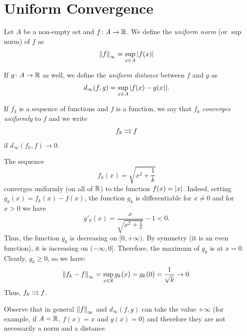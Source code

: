 \section{Uniform Convergence}

\begin{definition}
\mymark{***}
Let $A$ be a non-empty set and
$f\colon A \to {\mathbb R}$.
We define the \emph{uniform norm}%
 (or $\sup$ norm)
of $f$ as
\[
  {\left\Vert f\right\Vert}_\infty = \sup_{x\in A} {\left|f(x)\right|}
\]

If $g\colon A \to {\mathbb R}$ as well,
we define the \emph{uniform distance}
between $f$ and $g$ as
\[
  d_\infty(f,g) = \sup_{x\in A} {\left|f(x)-g(x)\right|}.
\]

If $f_k$ is a sequence of functions and $f$ is a function, we say that $f_k$
\emph{converges uniformly}
%
%
to $f$
and we write
\[
f_k \rightrightarrows f
\] if
$d_\infty(f_k,f)\to 0$.
\end{definition}


\begin{example}
\label{ex:466533}
The sequence
\[
f_k(x) = \sqrt{x^2 + \frac{1}{k}}
\]
converges uniformly (on all of ${\mathbb R}$) to the function $f(x) = {\left|x\right|}$. Indeed,
setting $g_k(x) = f_k(x) - f(x)$,
the function $g_k$ is differentiable for $x\neq 0$ and for $x>0$ we have
\[
  g'_k(x) = \frac{x}{\sqrt{x^2+\frac 1 k}} - 1 < 0.
\]
Thus, the function $g_k$ is decreasing on $[0,+\infty)$. By symmetry (it is an
even function), it is increasing on $(-\infty, 0]$.
Therefore, the maximum of $g_k$ is at $x=0$. Clearly, $g_k \ge 0$, so we have:
\[
  {\left\Vert f_k - f\right\Vert}_\infty = \sup_{x\in {\mathbb R}} g_k(x) = g_k(0) = \frac{1}{\sqrt k} \to 0.
\]
Thus, $f_k \rightrightarrows f$.
\end{example}

Observe that in general ${\left\Vert f\right\Vert}_\infty$ and $d_\infty(f,g)$ can take the value
$+\infty$ (for example, if $A={\mathbb R}$, $f(x)=x$ and $g(x)=0$)
and therefore they are not necessarily
a norm and a distance.

